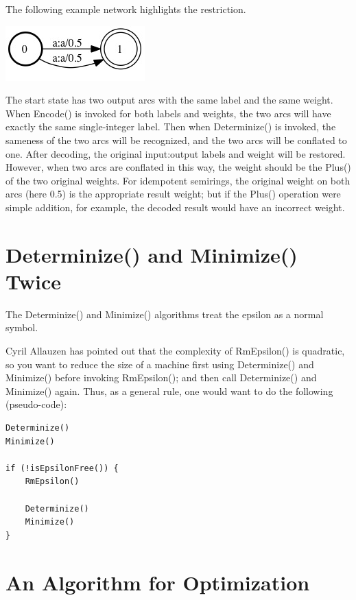 \documentclass[letterpaper,12pt]{article}
\begin{document}
The following example network highlights the restriction.  

\begin{center}
\includegraphics[scale=0.5]{images/cyclic.jpg}
\end{center}

\noindent
The start state
has two output arcs with the same label and the same weight.  When Encode() is
invoked for both labels and weights, the two arcs will have exactly the same
single-integer label.  Then when Determinize() is invoked, the sameness of the two arcs
will be recognized, and the two arcs will be conflated to one.  After decoding, the
original input:output labels and weight will be restored.  However, when two arcs
are conflated in this way, the weight should be the Plus() of the two original
weights.  For idempotent semirings, the original weight on both arcs (here 0.5) is the
appropriate result weight; but if the Plus() operation were simple addition, for
example, the decoded
result would have an incorrect weight.


\section{Determinize() and Minimize() Twice}

The Determinize() and Minimize() algorithms treat the epsilon as a normal symbol.

Cyril Allauzen has pointed out that the complexity of RmEpsilon() is quadratic, so
you want to reduce the size of a machine first using Determinize() and Minimize()
before invoking RmEpsilon(); and then call Determinize() and Minimize() again.
Thus, as a general rule, one would want to do the following
(pseudo-code):

\begin{Verbatim}[fontsize=\footnotesize]
Determinize()
Minimize()

if (!isEpsilonFree()) {
	RmEpsilon()

	Determinize()
	Minimize()
}
\end{Verbatim}

\section{An Algorithm for Optimization}
\end{document}
